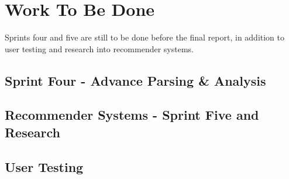 \chapter{Work To Be Done}

Sprints four and five are still to be done before the final report, in addition to user testing and research into recommender systems.

\section{Sprint Four - Advance Parsing \& Analysis}

\section{Recommender Systems - Sprint Five and Research}

\section{User Testing}